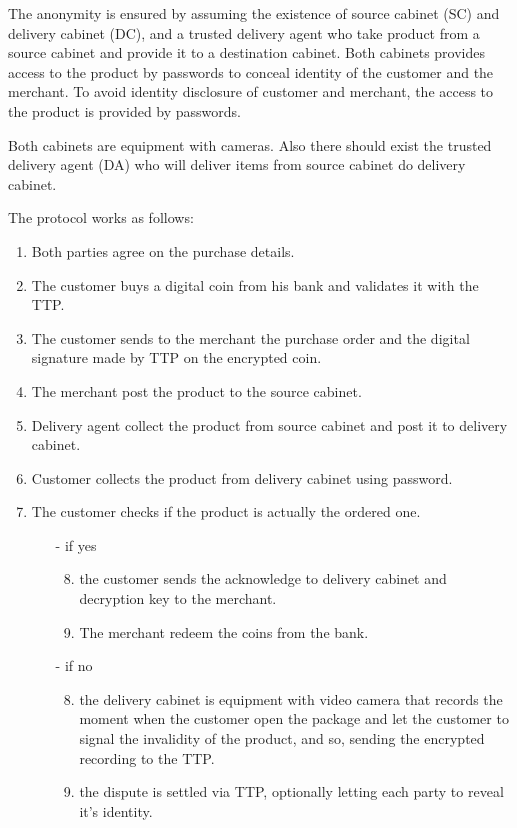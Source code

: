 \documentclass{article}
\begin{document}
The anonymity is ensured by assuming the existence of source cabinet (SC) and delivery cabinet (DC), and a trusted delivery agent who take product from a source cabinet and provide it to a destination cabinet. 
Both cabinets provides access to the product by passwords to conceal identity of the customer and the merchant.
To avoid identity disclosure of customer and merchant, the access to the product is provided by passwords. 

Both cabinets are equipment with cameras. Also there should exist the trusted delivery agent (DA) who will deliver items from source cabinet do delivery cabinet. 

The protocol works as follows:
\begingroup
\renewcommand{\labelenumii}{\arabic{enumii}.}
\begin{enumerate}
    \item Both parties agree on the purchase details.
    \item The customer buys a digital coin from his bank and validates it with the TTP.
    \item The customer sends to the merchant the purchase order and the digital signature made by TTP on the encrypted coin.
    \item The merchant post the product to the source cabinet.
    \item Delivery agent collect the product from source cabinet and post it to delivery cabinet.
    \item Customer collects the product from delivery cabinet using password.
    \item The customer checks if the product is actually the ordered one.
    \begin{itemize}
    \item[-] if yes 
        \begin{enumerate}
        \setcounter{enumii}{7}
        \item the customer sends the acknowledge to delivery cabinet and decryption key to the merchant.
        \item The merchant redeem the coins from the bank.
        \end{enumerate}
    \item[-] if no
        \begin{enumerate}
        \setcounter{enumii}{7}
        \item the delivery cabinet is equipment with video camera that records the moment when the customer open the package and let the customer to signal the invalidity of the product, and so, sending the encrypted recording to the TTP. 
        \item the dispute is settled via TTP, optionally letting each party to reveal it's identity.
    \end{enumerate}
    \end{itemize}
\end{enumerate}
\endgroup
\end{document}
